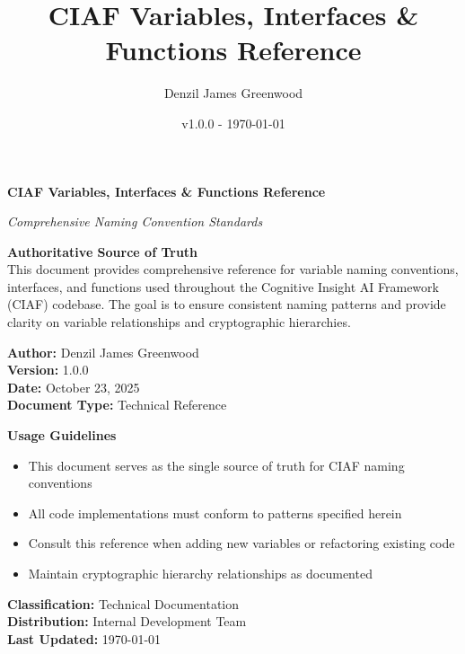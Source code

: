 \documentclass[12pt,a4paper]{article}
\title{CIAF Variables, Interfaces \& Functions Reference}
\author{Denzil James Greenwood}
\date{v1.0.0 - \today}
\begin{document}
\begin{titlepage}
\begin{center}

\vspace*{1cm}

{\Huge\bfseries CIAF Variables, Interfaces \& Functions Reference}

\vspace{0.5cm}
{\Large\textit{Comprehensive Naming Convention Standards}}

\vspace{1.5cm}

\begin{center}
\begin{infobox}
\centering
\textbf{Authoritative Source of Truth}\\
This document provides comprehensive reference for variable naming conventions, interfaces, and functions used throughout the Cognitive Insight AI Framework (CIAF) codebase. The goal is to ensure consistent naming patterns and provide clarity on variable relationships and cryptographic hierarchies.
\end{infobox}
\end{center}

\vspace{2cm}

{\Large
\textbf{Author:} Denzil James Greenwood\\
\textbf{Version:} 1.0.0\\
\textbf{Date:} October 23, 2025\\
\textbf{Document Type:} Technical Reference
}

\vspace{2cm}

\begin{center}
\begin{technicalbox}
\textbf{Usage Guidelines}
\begin{itemize}
\item This document serves as the single source of truth for CIAF naming conventions
\item All code implementations must conform to patterns specified herein
\item Consult this reference when adding new variables or refactoring existing code
\item Maintain cryptographic hierarchy relationships as documented
\end{itemize}
\end{technicalbox}
\end{center}

\vfill

{\small
\textbf{Classification:} Technical Documentation\\
\textbf{Distribution:} Internal Development Team\\
\textbf{Last Updated:} \today
}

\end{center}
\end{titlepage}
\end{document}
